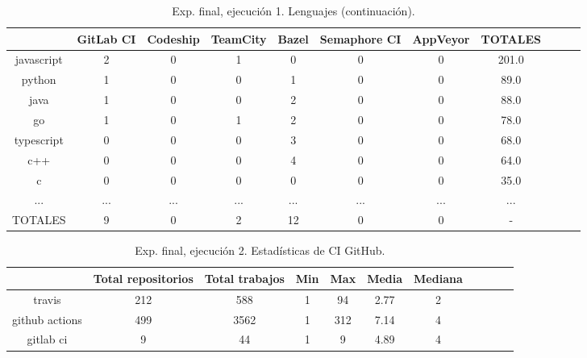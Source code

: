 \begin{table}[h]
  \centering
  \caption{Exp. final, ejecución 1. Lenguajes (continuación).}
  \label{tab:tabla_f2_2b}

\begin{footnotesize}
\renewcommand{\arraystretch}{1.5} %
\begin{tabular}{ccccccccccc}
  \hline
  {} &  GitLab CI &  Codeship &  TeamCity &  Bazel &  Semaphore CI &  AppVeyor &  TOTALES \\
  \hline
  javascript    &        2 &         0 &         1 &      0 &             0 &         0 &    201.0 \\
  python        &        1 &         0 &         0 &      1 &             0 &         0 &     89.0 \\
  java          &        1 &         0 &         0 &      2 &             0 &         0 &     88.0 \\
  go            &        1 &         0 &         1 &      2 &             0 &         0 &     78.0 \\
  typescript    &        0 &         0 &         0 &      3 &             0 &         0 &     68.0 \\
  c++           &        0 &         0 &         0 &      4 &             0 &         0 &     64.0 \\
  c             &        0 &         0 &         0 &      0 &             0 &         0 &     35.0 \\
  ...           &      ... &       ... &       ... &    ... &           ... &       ... &      ... \\
  TOTALES       &        9 &         0 &         2 &     12 &             0 &         0 &        - \\
 \end{tabular}
\end{footnotesize}

\end{table}

\begin{table}[h]
  \centering
  \caption{Exp. final, ejecución 2. Estadísticas de CI GitHub.}
  \label{tab:tabla_f2_3}

\begin{footnotesize}
\renewcommand{\arraystretch}{1.5} %
\begin{tabular}{ccccccccccc}
  \hline
  {} &  Total repositorios &  Total trabajos &  Min &  Max &  Media &  Mediana \\
  \hline
  travis         &        212 &         588 &    1 &   94 &   2.77 &        2 \\
  github actions &        499 &        3562 &    1 &  312 &   7.14 &        4 \\
  gitlab ci      &          9 &          44 &    1 &    9 &   4.89 &        4 \\
 \end{tabular}
\end{footnotesize}

\end{table}

